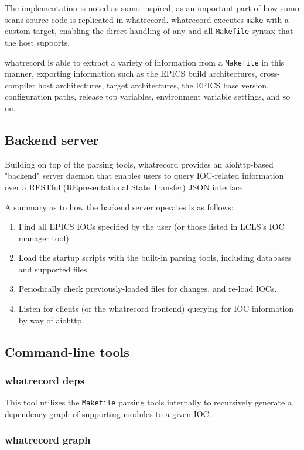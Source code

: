 \documentclass[letter,
               keeplastbox,   %
               ]{jacow}
\begin{document}
The implementation is noted as sumo\cite{sumo}-inspired, as an important part
of how sumo scans source code is replicated in whatrecord. whatrecord
executes \verb_make_ with a custom target, enabling the direct handling of
any and all \verb_Makefile_ syntax that the host supports.

whatrecord is able to extract a variety of information from a \verb_Makefile_
in this manner, exporting information such as the EPICS build architectures,
cross-compiler host architectures, target architectures, the EPICS base
version, configuration paths, release top variables, environment variable
settings, and so on.

\subsection{Backend server}

Building on top of the parsing tools, whatrecord provides an aiohttp-based
"backend" server daemon that enables users to query IOC-related information
over a RESTful (REpresentational State Transfer) JSON interface.

A summary as to how the backend server operates is as follows:

\begin{enumerate}
  \item Find all EPICS IOCs specified by the user (or those listed in LCLS's
    IOC manager tool)
  \item Load the startup scripts with the built-in parsing tools, including databases and supported files.
  \item Periodically check previously-loaded files for changes, and re-load IOCs.
  \item Listen for clients (or the whatrecord frontend) querying for IOC information by way of aiohttp.
\end{enumerate}

\subsection{Command-line tools}
\subsubsection{whatrecord deps}

This tool utilizes the \verb_Makefile_ parsing tools internally to recursively
generate a dependency graph of supporting modules to a given IOC.

\subsubsection{whatrecord graph}
\end{document}
